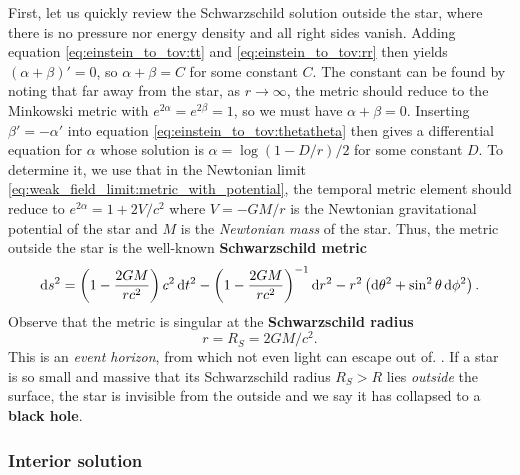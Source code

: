 First, let us quickly review the Schwarzschild solution outside the star, where there is no pressure nor energy density and all right sides vanish.
Adding equation \eqref{eq:einstein_to_tov:tt} and \eqref{eq:einstein_to_tov:rr} then yields $(\alpha + \beta)' = 0$, so $\alpha + \beta = C$ for some constant $C$.
The constant can be found by noting that far away from the star, as $r \rightarrow \infty$, the metric should reduce to the Minkowski metric with $e^{2\alpha} = e^{2 \beta} = 1$, so we must have $\alpha + \beta = 0$.
Inserting $\beta' = -\alpha'$ into equation \eqref{eq:einstein_to_tov:thetatheta} then gives a differential equation for $\alpha$ whose solution is $\alpha = \log \left( 1 - D / r \right) / 2$ for some constant $D$.
To determine it, we use that in the Newtonian limit \eqref{eq:weak_field_limit:metric_with_potential}, the temporal metric element should reduce to $e^{2 \alpha} = 1 + 2 V / c^2$ where $V = - G M / r$ is the Newtonian gravitational potential of the star and $M$ is the \emph{Newtonian mass} of the star.
Thus, the metric outside the star is the well-known \textbf{Schwarzschild metric}
\begin{equation}
	\mathop{}\!\mathrm{d} s^2 = \left( 1 - \frac{2 G M}{r c^2} \right) c^2 \mathop{}\!\mathrm{d} t^2 - \left( 1 - \frac{2 G M}{r c^2} \right)^{-1} \mathop{}\!\mathrm{d} r^2 - r^2 \left( \mathop{}\!\mathrm{d} \theta^2 + \sin^2 \theta \mathop{}\!\mathrm{d} \phi^2 \right) .
\label{eq:tov:schwarzschild_metric}
\end{equation}
Observe that the metric is singular at the \textbf{Schwarzschild radius}
\begin{equation}
	r = R_S = 2 G M / c^2.
\label{eq:tov:schwarzschild_radius}
\end{equation}
This is an \emph{event horizon}, from which not even light can escape out of. \cite[section 5.6]{ref:carroll}.
If a star is so small and massive that its Schwarzschild radius $R_S > R$ lies \emph{outside} the surface, the star is invisible from the outside and we say it has collapsed to a \textbf{black hole}.

\subsubsection{Interior solution}

